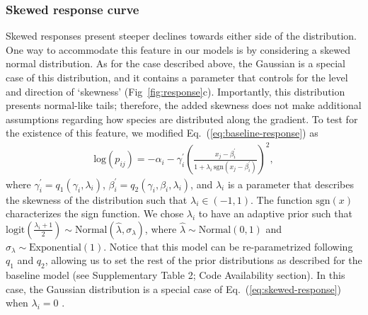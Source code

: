 \documentclass[11pt, a4paper]{article}
\begin{document}
\subsubsection*{Skewed response curve}
Skewed responses present steeper declines towards either side of the distribution. One way to accommodate this feature in our models is by considering a skewed normal distribution. As for the case described above, the Gaussian is a special case of this distribution, and it contains a parameter that controls for the level and direction of `skewness' (Fig~\ref{fig:response}c). Importantly, this distribution presents normal-like tails; therefore, the added skewness does not make additional assumptions regarding how species are distributed along the gradient. To test for the existence of this feature, we modified Eq.~(\ref{eq:baseline-response}) as
\begin{equation}	
\begin{split}
\text{log}\left(p_{ij}\right) = -\alpha_{i} - \gamma^{\prime}_{i}\left(\frac{x_{j}-\beta^{\prime}_{i}}{1+\lambda_{i}\,\text{sgn}\left(x_{j}-\beta^{\prime}_{i}\right)}\right)^{2} ,
\end{split}
\label{eq:skewed-response}
\end{equation}
where $\gamma^{\prime}_{i} = q_{1}\left(\gamma_{i}, \lambda_{i}\right)$, $\beta^{\prime}_{i} = q_{2}\left(\gamma_{i}, \beta_{i}, \lambda_{i}\right)$, and $\lambda_{i}$ is a parameter that describes the skewness of the distribution such that $\lambda_{i}\in\left(-1, 1\right)$. The function $\text{sgn}\left(x\right)$ characterizes the sign function.  We chose $\lambda_i$ to have an adaptive prior such that $\text{logit}\left(\frac{\lambda_{i}+1}{2}\right)\sim \text{Normal}\left(\hat{\lambda}, \sigma_{\lambda}\right)$, where $\hat{\lambda}\sim\text{Normal}\left(0, 1\right)$ and $\sigma_{\lambda}\sim\text{Exponential}\left(1\right)$. Notice that this model can be re-parametrized following $q_1$ and $q_2$, allowing us to set the rest of the prior distributions as described for the baseline model (see Supplementary Table 2; Code Availability section). In this case, the Gaussian distribution is a special case of Eq.~(\ref{eq:skewed-response}) when $\lambda_{i}=0$ \citep{ashourApproximateSkewNormal2010}.
\end{document}

